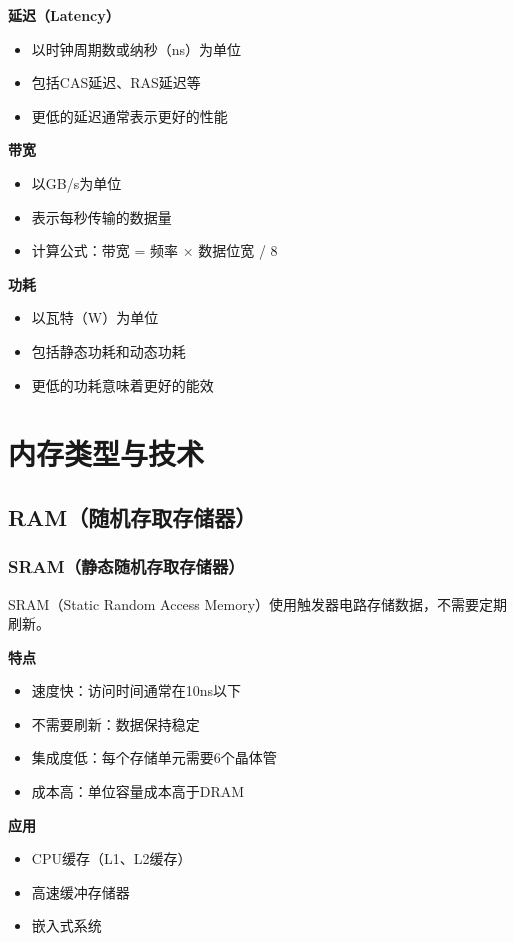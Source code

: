\documentclass{article}
\begin{document}
\textbf{延迟（Latency）}
\begin{itemize}
    \item 以时钟周期数或纳秒（ns）为单位
    \item 包括CAS延迟、RAS延迟等
    \item 更低的延迟通常表示更好的性能
\end{itemize}

\textbf{带宽}
\begin{itemize}
    \item 以GB/s为单位
    \item 表示每秒传输的数据量
    \item 计算公式：带宽 = 频率 × 数据位宽 / 8
\end{itemize}

\textbf{功耗}
\begin{itemize}
    \item 以瓦特（W）为单位
    \item 包括静态功耗和动态功耗
    \item 更低的功耗意味着更好的能效
\end{itemize}

\section{内存类型与技术}

\subsection{RAM（随机存取存储器）}

\subsubsection{SRAM（静态随机存取存储器）}

SRAM（Static Random Access Memory）使用触发器电路存储数据，不需要定期刷新。

\textbf{特点}
\begin{itemize}
    \item 速度快：访问时间通常在10ns以下
    \item 不需要刷新：数据保持稳定
    \item 集成度低：每个存储单元需要6个晶体管
    \item 成本高：单位容量成本高于DRAM
\end{itemize}

\textbf{应用}
\begin{itemize}
    \item CPU缓存（L1、L2缓存）
    \item 高速缓冲存储器
    \item 嵌入式系统
\end{itemize}
\end{document}
